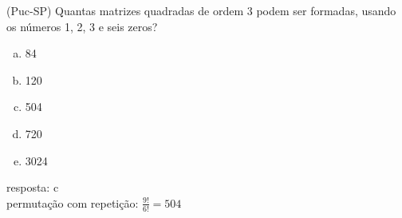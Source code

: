 \begin{ex}
 (Puc-SP) Quantas matrizes quadradas de ordem 3 podem ser formadas, usando os números 1, 2, 3 e seis zeros?
    \begin{enumerate}[(a)]
    \item 84
    \item 120
    \item 504
    \item 720
    \item 3024
    \end{enumerate}
      \begin{sol}
        resposta: c \\
        permutação com repetição: $\frac{9!}{6!}=504$
      \end{sol}
\end{ex}